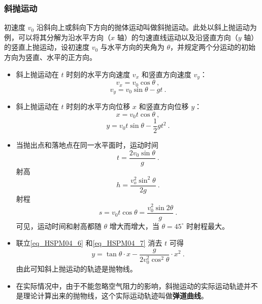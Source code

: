 \subsubsection{斜抛运动}

初速度 $v_0$ 沿斜向上或斜向下方向的抛体运动叫做斜抛运动。此处以斜上抛运动为例，可以将其分解为沿水平方向（$x$ 轴）的匀速直线运动以及沿竖直方向（$y$ 轴）的竖直上抛运动，设初速度 $v_0$ 与水平方向的夹角为 $\theta$，并规定两个分运动的初始方向为竖直、水平的正方向。

\begin{itemize}
\item 斜上抛运动在 $t$ 时刻的水平方向速度 $v_x$ 和竖直方向速度 $v_y$：
\begin{equation}
v_x=v_0\cos\theta~,
\end{equation}
\begin{equation}
v_y=v_0\sin\theta-gt~.
\end{equation}

\item 斜上抛运动在 $t$ 时刻的水平方向位移 $x$ 和竖直方向位移 $y$：
\begin{equation}\label{eq_HSPM04_6}
x=v_0t\cos\theta~,
\end{equation}
\begin{equation}\label{eq_HSPM04_7}
y= v_0t\sin\theta-\frac12 gt^2~.
\end{equation}

\item 当抛出点和落地点在同一水平面时，运动时间
\begin{equation}
t=\frac{2v_0\sin\theta}{g}~.
\end{equation}
射高
\begin{equation}
h=\frac{v_o^2\sin^2\theta}{2g}~.
\end{equation}
射程
\begin{equation}
s=v_0t\cos\theta=\frac{v_0^2\sin{2\theta}}{g}~.
\end{equation}
可见，运动时间和射高都随 $\theta$ 增大而增大，当 $\theta=45^\circ$ 时射程最大。

\item 联立\autoref{eq_HSPM04_6} 和\autoref{eq_HSPM04_7} 消去 $t$ 可得
\begin{equation}
y=\tan\theta\cdot x-\frac{g}{2v_0^2\cos^2\theta}\cdot x^2~.
\end{equation}
由此可知斜上抛运动的轨迹是抛物线。

\item 在实际情况中，由于不能忽略空气阻力的影响，斜抛运动的实际运动轨迹并不是理论计算出来的抛物线，这个实际运动轨迹叫做\textbf{弹道曲线}。
\end{itemize}
